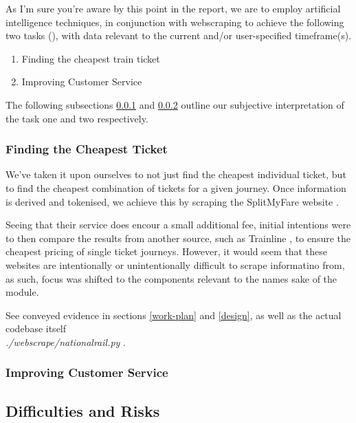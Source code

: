 \documentclass[11pt]{article}
\begin{document}
As I'm sure you're aware by this point in the report, we are to employ artificial intelligence techniques, in conjunction with webscraping to achieve the following two tasks (\cite{AI2018CW}), with data relevant to the current and/or user-specified timeframe(s).

\begin{enumerate}
    \item Finding the cheapest train ticket
    \item Improving Customer Service
\end{enumerate}

The following subsections \ref{finding-cheapest-ticket} and \ref{improving-service} outline our subjective interpretation of the task one and two respectively. 

\subsubsection{Finding the Cheapest Ticket} \label{finding-cheapest-ticket}

We've taken it upon ourselves to not just find the cheapest individual ticket, but to find the cheapest combination of tickets for a given journey. Once information is derived and tokenised, we achieve this by scraping the SplitMyFare website \cite{splitmyfare}.

Seeing that their service does encour a small additional fee, initial intentions were to then compare the results from another source, such as Trainline \cite{trainline}, to ensure the cheapest pricing of single ticket journeys. However, it would seem that these websites are intentionally or unintentionally difficult to scrape informatino from, as such, focus was shifted to the components relevant to the names sake of the module.

See conveyed evidence in sections \ref{work-plan} and \ref{design}, as well as the actual codebase itself\\ \textit{./webscrape/nationalrail.py} \cite{repo}.

\subsubsection{Improving Customer Service} \label{improving-service}



\subsection{Difficulties and Risks} \label{difficulties-risks}
\end{document}
